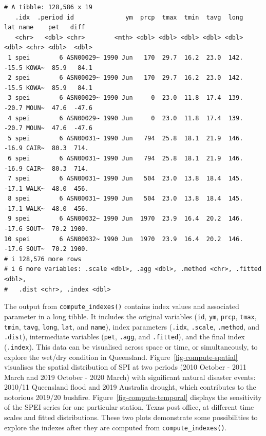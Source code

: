 \documentclass[
]{interact}
\begin{document}
\begin{verbatim}
# A tibble: 128,586 x 19
   .idx  .period id              ym  prcp  tmax  tmin  tavg  long   lat name    pet   diff
   <chr>   <dbl> <chr>        <mth> <dbl> <dbl> <dbl> <dbl> <dbl> <dbl> <chr> <dbl>  <dbl>
 1 spei        6 ASN00029~ 1990 Jun   170  29.7  16.2  23.0  142. -15.5 KOWA~  85.9   84.1
 2 spei        6 ASN00029~ 1990 Jun   170  29.7  16.2  23.0  142. -15.5 KOWA~  85.9   84.1
 3 spei        6 ASN00029~ 1990 Jun     0  23.0  11.8  17.4  139. -20.7 MOUN~  47.6  -47.6
 4 spei        6 ASN00029~ 1990 Jun     0  23.0  11.8  17.4  139. -20.7 MOUN~  47.6  -47.6
 5 spei        6 ASN00031~ 1990 Jun   794  25.8  18.1  21.9  146. -16.9 CAIR~  80.3  714. 
 6 spei        6 ASN00031~ 1990 Jun   794  25.8  18.1  21.9  146. -16.9 CAIR~  80.3  714. 
 7 spei        6 ASN00031~ 1990 Jun   504  23.0  13.8  18.4  145. -17.1 WALK~  48.0  456. 
 8 spei        6 ASN00031~ 1990 Jun   504  23.0  13.8  18.4  145. -17.1 WALK~  48.0  456. 
 9 spei        6 ASN00032~ 1990 Jun  1970  23.9  16.4  20.2  146. -17.6 SOUT~  70.2 1900. 
10 spei        6 ASN00032~ 1990 Jun  1970  23.9  16.4  20.2  146. -17.6 SOUT~  70.2 1900. 
# i 128,576 more rows
# i 6 more variables: .scale <dbl>, .agg <dbl>, .method <chr>, .fitted <dbl>,
#   .dist <chr>, .index <dbl>
\end{verbatim}

The output from \texttt{compute\_indexes()} contains index values and
associated parameter in a long tibble. It includes the original
variables (\texttt{id}, \texttt{ym}, \texttt{prcp}, \texttt{tmax},
\texttt{tmin}, \texttt{tavg}, \texttt{long}, \texttt{lat}, and
\texttt{name}), index parameters (\texttt{.idx}, \texttt{.scale},
\texttt{.method}, and \texttt{.dist}), intermediate variables
(\texttt{pet}, \texttt{.agg}, and \texttt{.fitted}), and the final index
(\texttt{.index}). This data can be visualised across space or time, or
simultaneously, to explore the wet/dry condition in Queensland.
Figure~\ref{fig-compute-spatial} visualises the spatial distribution of
SPI at two periods (2010 October - 2011 March and 2019 October - 2020
March) with significant natural disaster events: 2010/11 Queensland
flood and 2019 Australia drought, which contributes to the notorious
2019/20 bushfire. Figure~\ref{fig-compute-temporal} displays the
sensitivity of the SPEI series for one particular station, Texas post
office, at different time scales and fitted distributions. These two
plots demonstrate some possibilities to explore the indexes after they
are computed from \texttt{compute\_indexes()}.
\end{document}
